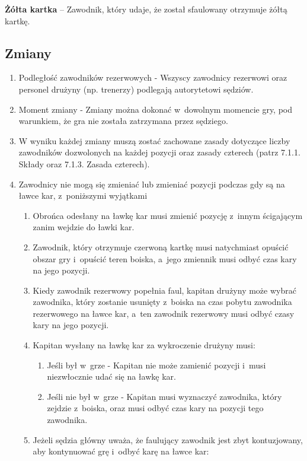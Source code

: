\documentclass[12pt,a4paper]{article}
\renewcommand{\subsubsection}[1]{
  \oldsubsubsection{#1}%
  \leftskip1.3cm
}
\newcommand\yellowcard[1]{\bgroup\textcolor{darkyellow}{\textbf{#1}}}
\begin{document}
\yellowcard{Żółta kartka} -- Zawodnik, który udaje, że został sfaulowany
otrzymuje żółtą kartkę.

\subsection{Zmiany}

\subsubsection{Zasady zmian}

\begin{enumerate}
	\item
	      Podległość zawodników rezerwowych - Wszyscy zawodnicy
	      rezerwowi oraz personel drużyny (np. trenerzy) podlegają autorytetowi
	      sędziów.
	\item
	      Moment zmiany - Zmiany można dokonać w~dowolnym momencie gry,
	      pod warunkiem, że gra nie została zatrzymana przez sędziego.
	\item
	      W wyniku każdej zmiany muszą zostać zachowane zasady dotyczące liczby
	      zawodników dozwolonych na każdej pozycji oraz zasady czterech (patrz
	      7.1.1. Składy oraz 7.1.3. Zasada czterech).
	\item
	      Zawodnicy nie mogą się zmieniać lub zmieniać pozycji podczas gdy są na
	      ławce kar, z~poniższymi wyjątkami

	      \begin{enumerate}
		      \item
		            Obrońca odesłany na ławkę kar musi zmienić pozycję z~innym
		            ścigającym zanim wejdzie do ławki kar.
		      \item
		            Zawodnik, który otrzymuje czerwoną kartkę musi natychmiast opuścić
		            obszar gry i~opuścić teren boiska, a~jego zmiennik musi odbyć czas
		            kary na jego pozycji.
		      \item
		            Kiedy zawodnik rezerwowy popełnia faul, kapitan drużyny może wybrać
		            zawodnika, który zostanie usunięty z~boiska na czas pobytu zawodnika
		            rezerwowego na ławce kar, a~ten zawodnik rezerwowy musi odbyć czasy
		            kary na jego pozycji.
		      \item
		            Kapitan wysłany na ławkę kar za wykroczenie drużyny musi:

		            \begin{enumerate}
			            \item
			                  Jeśli był w~grze - Kapitan nie może zamienić pozycji i~musi
			                  niezwłocznie udać się na ławkę kar.
			            \item
			                  Jeśli nie był w~grze - Kapitan musi wyznaczyć zawodnika, który
			                  zejdzie z~boiska, oraz musi odbyć czas kary na pozycji tego
			                  zawodnika.
		            \end{enumerate}
		      \item
		            Jeżeli sędzia główny uważa, że faulujący zawodnik jest zbyt
		            kontuzjowany, aby kontynuować grę i~odbyć karę na ławce kar:


\end{enumerate}
\end{enumerate}
\end{document}
